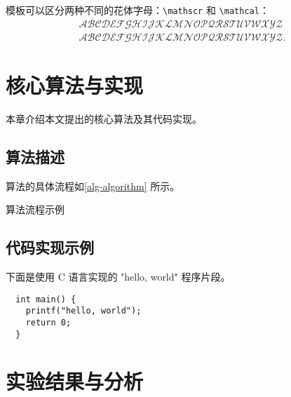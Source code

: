 \documentclass{sysuthesis}
\begin{document}
模板可以区分两种不同的花体字母：\verb|\mathscr| 和 \verb|\mathcal|：
\begin{gather*}
  \mathscr{A} \mathscr{B} \mathscr{C} \mathscr{D} \mathscr{E} \mathscr{F} \mathscr{G} \mathscr{H} \mathscr{I} \mathscr{J} \mathscr{K} \mathscr{L} \mathscr{M} \mathscr{N} \mathscr{O} \mathscr{P} \mathscr{Q} \mathscr{R} \mathscr{S} \mathscr{T} \mathscr{U} \mathscr{V} \mathscr{W} \mathscr{X} \mathscr{Y} \mathscr{Z}\\
  \mathcal{A} \mathcal{B} \mathcal{C} \mathcal{D} \mathcal{E} \mathcal{F} \mathcal{G} \mathcal{H} \mathcal{I} \mathcal{J} \mathcal{K} \mathcal{L} \mathcal{M} \mathcal{N} \mathcal{O} \mathcal{P} \mathcal{Q} \mathcal{R} \mathcal{S} \mathcal{T} \mathcal{U} \mathcal{V} \mathcal{W} \mathcal{X} \mathcal{Y} \mathcal{Z}.
\end{gather*}

\chapter{核心算法与实现}

本章介绍本文提出的核心算法及其代码实现。

\section{算法描述}

算法的具体流程如\autoref{alg-algorithm} 所示。

\begin{algorithm}[H]
  \caption{算法流程示例}
  \label{alg-algorithm}
\end{algorithm}

\section{代码实现示例}

下面是使用 C 语言实现的 "hello, world" 程序片段。

\begin{verbatim}
  int main() {
    printf("hello, world");
    return 0;
  }
\end{verbatim}

\chapter{实验结果与分析}
\end{document}
